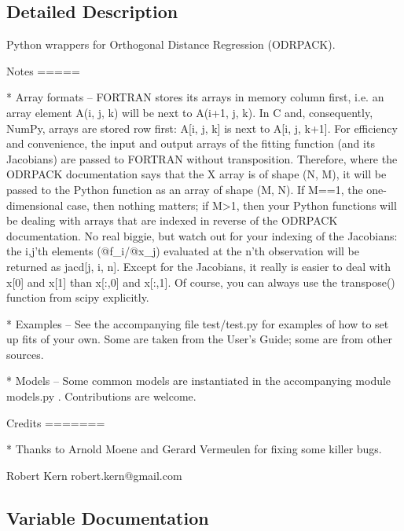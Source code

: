 \subsection{Detailed Description}
\begin{DoxyVerb}Python wrappers for Orthogonal Distance Regression (ODRPACK).

Notes
=====

* Array formats -- FORTRAN stores its arrays in memory column first, i.e. an
  array element A(i, j, k) will be next to A(i+1, j, k). In C and, consequently,
  NumPy, arrays are stored row first: A[i, j, k] is next to A[i, j, k+1]. For
  efficiency and convenience, the input and output arrays of the fitting
  function (and its Jacobians) are passed to FORTRAN without transposition.
  Therefore, where the ODRPACK documentation says that the X array is of shape
  (N, M), it will be passed to the Python function as an array of shape (M, N).
  If M==1, the one-dimensional case, then nothing matters; if M>1, then your
  Python functions will be dealing with arrays that are indexed in reverse of
  the ODRPACK documentation. No real biggie, but watch out for your indexing of
  the Jacobians: the i,j'th elements (@f_i/@x_j) evaluated at the n'th
  observation will be returned as jacd[j, i, n]. Except for the Jacobians, it
  really is easier to deal with x[0] and x[1] than x[:,0] and x[:,1]. Of course,
  you can always use the transpose() function from scipy explicitly.

* Examples -- See the accompanying file test/test.py for examples of how to set
  up fits of your own. Some are taken from the User's Guide; some are from
  other sources.

* Models -- Some common models are instantiated in the accompanying module
  models.py . Contributions are welcome.

Credits
=======

* Thanks to Arnold Moene and Gerard Vermeulen for fixing some killer bugs.

Robert Kern
robert.kern@gmail.com\end{DoxyVerb}
 

\subsection{Variable Documentation}
\hypertarget{namespacescipy_1_1odr_1_1odrpack_a22fc156aa61462fcc50dff98c62ce2aa}{}
